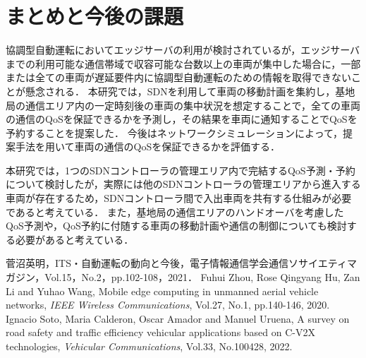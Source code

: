 \documentclass[a4paper,10pt,twocolumn,uplatex]{jsarticle}
\begin{document}
\section{まとめと今後の課題}
協調型自動運転においてエッジサーバの利用が検討されているが，エッジサーバまでの利用可能な通信帯域で収容可能な台数以上の車両が集中した場合に，一部または全ての車両が遅延要件内に協調型自動運転のための情報を取得できないことが懸念される．
本研究では，SDNを利用して車両の移動計画を集約し，基地局の通信エリア内の一定時刻後の車両の集中状況を想定することで，全ての車両の通信のQoSを保証できるかを予測し，その結果を車両に通知することでQoSを予約することを提案した．
今後はネットワークシミュレーションによって，提案手法を用いて車両の通信のQoSを保証できるかを評価する．\par
本研究では，1つのSDNコントローラの管理エリア内で完結するQoS予測・予約について検討したが，実際には他のSDNコントローラの管理エリアから進入する車両が存在するため，SDNコントローラ間で入出車両を共有する仕組みが必要であると考えている．
また，基地局の通信エリアのハンドオーバを考慮したQoS予測や，QoS予約に付随する車両の移動計画や通信の制御についても検討する必要があると考えている．

\footnotesize{
  \begin{thebibliography}{99}
     菅沼英明，ITS・自動運転の動向と今後，電子情報通信学会通信ソサイエティマガジン，Vol.15，No.2，pp.102-108，2021．
     Fuhui Zhou, Rose Qingyang Hu, Zan Li and Yuhao Wang, Mobile edge computing in unmanned aerial vehicle networks, \textit{IEEE Wireless Communications}, Vol.27, No.1, pp.140-146, 2020.
     Ignacio Soto, Maria Calderon, Oscar Amador and Manuel Uruena, A survey on road safety and traffic efficiency vehicular applications based on C-V2X technologies, \textit{Vehicular Communications}, Vol.33, No.100428, 2022.
  \end{thebibliography}
}

% 
% 

\end{document}
